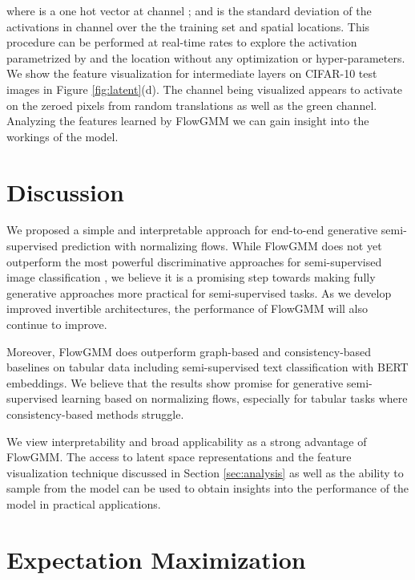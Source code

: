 \documentclass{article}
\newcommand{\method}{FlowGMM\xspace}
\begin{document}
where  is a one hot vector at channel ; and  is the standard deviation of the activations in channel  over the the training set and spatial locations. 
This procedure can be performed at real-time rates to explore the activation parametrized by  and the location  
without any optimization or hyper-parameters. We show the feature visualization for intermediate layers on CIFAR-10 test images in Figure \ref{fig:latent}(d). The channel being visualized appears to activate on the zeroed pixels from random translations as well as the green channel.
Analyzing the features learned by \method we can gain insight into the workings of the model.

\section{Discussion}

We proposed a simple and interpretable approach for end-to-end generative semi-supervised prediction with normalizing flows. While \method does not yet outperform the most powerful discriminative approaches for semi-supervised image classification \citep{athiwaratkun2018there, verma2019interpolation}, we believe it is a promising step towards making fully generative approaches more practical for semi-supervised tasks. As we develop improved invertible architectures, the performance of \method will also continue to improve.

Moreover, \method does outperform graph-based and consistency-based baselines on tabular data including semi-supervised text classification with BERT embeddings.
We believe that the results show promise for generative semi-supervised learning based on normalizing flows, especially for tabular tasks where consistency-based methods struggle. 

We view interpretability and broad applicability as a strong advantage of \method.
The access to latent space representations and the feature visualization technique discussed in Section \ref{sec:analysis} as well as the ability to sample from the model can be used to obtain insights into the performance of the model in practical applications.






\cleardoublepage
\appendix

\section{Expectation Maximization}\label{sec:em}
\end{document}
